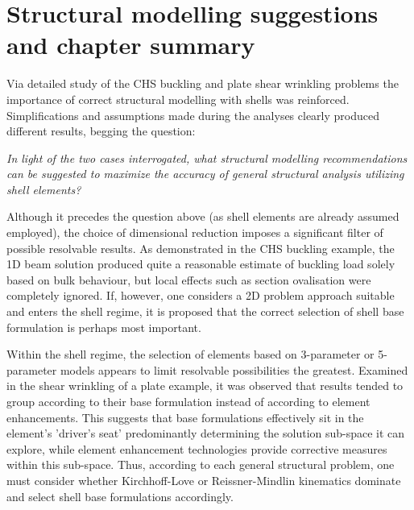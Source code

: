 \section{Structural modelling suggestions and chapter summary}
Via detailed study of the CHS buckling and plate shear wrinkling problems the importance of correct structural modelling with shells was reinforced. Simplifications and assumptions made during the analyses clearly produced different results, begging the question:

\begin{center}
\textit{In light of the two cases interrogated, what structural modelling recommendations can be suggested to maximize the accuracy of general structural analysis utilizing shell elements?}
\end{center}

Although it precedes the question above (as shell elements are already assumed employed), the choice of dimensional reduction imposes a significant filter of possible resolvable results. As demonstrated in the CHS buckling example, the 1D beam solution produced quite a reasonable estimate of buckling load solely based on bulk behaviour, but local effects such as section ovalisation were completely ignored. If, however, one considers a 2D problem approach suitable and enters the shell regime, it is proposed that the correct selection of shell base formulation is perhaps most important.

Within the shell regime, the selection of elements based on 3-parameter or 5-parameter models appears to limit resolvable possibilities the greatest. Examined in the shear wrinkling of a plate example, it was observed that results tended to group according to their base formulation instead of according to element enhancements. This suggests that base formulations effectively sit in the element's 'driver's seat' predominantly determining the solution sub-space it can explore, while element enhancement technologies provide corrective measures within this sub-space. Thus, according to each general structural problem, one must consider whether Kirchhoff-Love or Reissner-Mindlin kinematics dominate and select shell base formulations accordingly.

